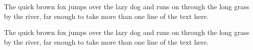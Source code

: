 \documentclass{article}
\begin{document}
The quick brown fox jumps over the lazy dog and runs on through the long grass by the river, far enough to take more than one line of the text here.

The quick brown fox jumps over the lazy dog and runs on through the long grass by the river, far enough to take more than one line of the text here.
\end{document}
